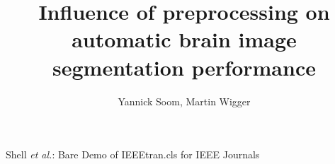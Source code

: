 \documentclass[journal]{IEEEtran}
\begin{document}
%
\title{Influence of preprocessing on automatic brain image segmentation performance}
%
%
%

\author{Yannick Soom,
        Martin Wigger %
}

% 
%



%
{Shell \MakeLowercase{\textit{et al.}}: Bare Demo of IEEEtran.cls for IEEE Journals}
% 
\end{document}
